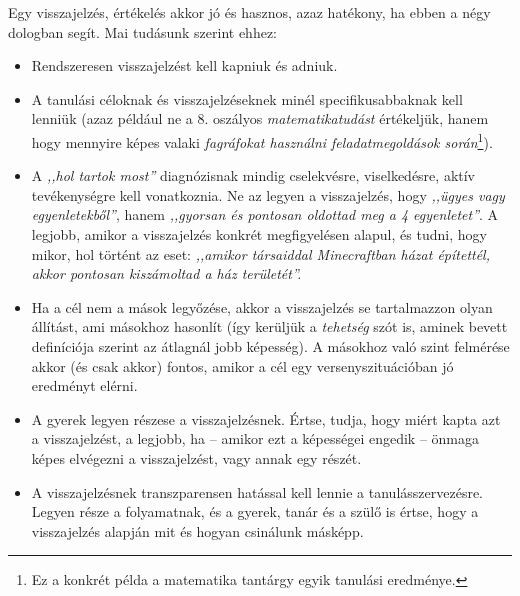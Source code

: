 Egy visszajelzés, értékelés akkor jó és hasznos, azaz hatékony, ha ebben a négy dologban segít. Mai tudásunk szerint ehhez:
\begin{itemize}
      \item Rendszeresen visszajelzést kell kapniuk és adniuk.
      \item A tanulási céloknak és visszajelzéseknek minél specifikusabbaknak kell lenniük (azaz például ne a 8. oszályos \emph{matematikatudást} értékeljük, hanem hogy mennyire képes valaki \emph{fagráfokat használni feladatmegoldások során}\footnote{Ez a konkrét példa a matematika tantárgy egyik tanulási eredménye.}).
      \item A \emph{,,hol tartok most''} diagnózisnak mindig cselekvésre, viselkedésre, aktív tevékenységre kell vonatkoznia. Ne az legyen a visszajelzés, hogy \emph{,,ügyes vagy egyenletekből''}, hanem \emph{,,gyorsan és       pontosan oldottad meg a 4 egyenletet''}. A legjobb, amikor a visszajelzés konkrét megfigyelésen alapul, és tudni, hogy mikor, hol történt az eset: \emph{,,amikor társaiddal Minecraftban házat építettél, akkor       pontosan kiszámoltad a ház területét''.}
      \item Ha a cél nem a mások legyőzése, akkor a visszajelzés se tartalmazzon olyan állítást, ami másokhoz hasonlít (így kerüljük a \emph{tehetség} szót is, aminek bevett definíciója szerint az átlagnál jobb képesség). A másokhoz való szint felmérése akkor (és csak akkor) fontos, amikor a cél egy versenyszituációban jó eredményt elérni.

      \item A gyerek legyen részese a visszajelzésnek. Értse, tudja, hogy miért kapta azt a visszajelzést, a legjobb, ha -- amikor ezt a képességei engedik -- önmaga képes elvégezni a visszajelzést, vagy annak egy részét.
      \item A visszajelzésnek transzparensen hatással kell lennie a tanulásszervezésre. Legyen része a folyamatnak, és a gyerek, tanár és a szülő is értse, hogy a visszajelzés alapján mit és hogyan csinálunk másképp.
\end{itemize}

